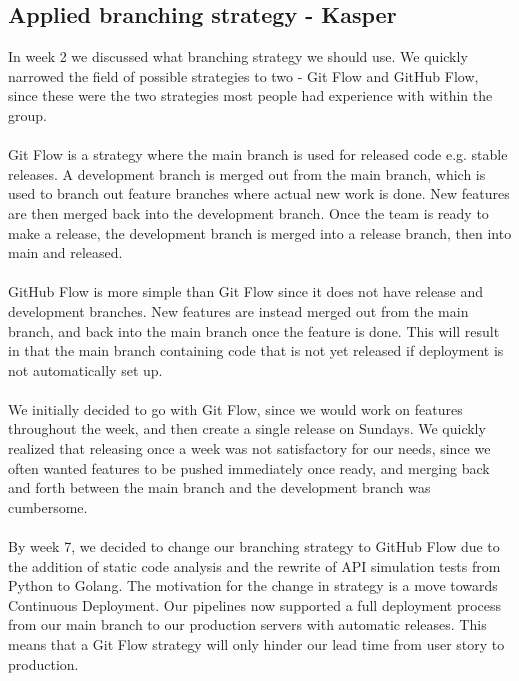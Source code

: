 \subsection{Applied branching strategy - Kasper}
In week 2 we discussed what branching strategy we should use. We quickly narrowed the field of possible strategies to two - Git Flow and GitHub Flow, since these were the two strategies most people had experience with within the group. 
\\\\
Git Flow is a strategy where the main branch is used for released code e.g. stable releases. A development branch is merged out from the main branch, which is used to branch out feature branches where actual new work is done. New features are then merged back into the development branch. Once the team is ready to make a release, the development branch is merged into a release branch, then into main and released.
\\\\
GitHub Flow is more simple than Git Flow since it does not have release and development branches. New features are instead merged out from the main branch, and back into the main branch once the feature is done. This will result in that the main branch containing code that is not yet released if deployment is not automatically set up.
\\\\
We initially decided to go with Git Flow, since we would work on features throughout the week, and then create a single release on Sundays. We quickly realized that releasing once a week was not satisfactory for our needs, since we often wanted features to be pushed immediately once ready, and merging back and forth between the main branch and the development branch was cumbersome.
\\\\
By week 7, we decided to change our branching strategy to GitHub Flow due to the addition of static code analysis and the rewrite of API simulation tests from Python to Golang. The motivation for the change in strategy is a move towards Continuous Deployment. Our pipelines now supported a full deployment process from our main branch to our production servers with automatic releases. This means that a Git Flow strategy will only hinder our lead time from user story to production.